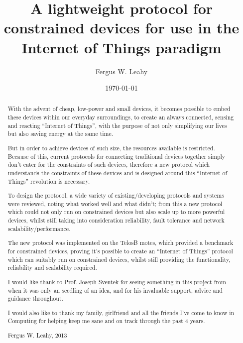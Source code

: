 \documentclass{l4proj}
\begin{document}
\title{A lightweight protocol for constrained devices for use in the Internet of Things paradigm}
\author{Fergus W. Leahy}
\date{\today}
\maketitle

\begin{abstract}
With the advent of cheap, low-power and small devices, it becomes possible to embed these devices within our everyday surroundings, to create an always connected, sensing and reacting ``Internet of Things'', with the purpose of not only simplifying our lives but also saving energy at the same time. 

But in order to achieve devices of such size, the resources available is restricted. Because of this, current protocols for connecting traditional devices together simply don't cater for the constraints of such devices, therefore a new protocol which understands the constraints of these devices and is designed around this ``Internet of Things'' revolution is necessary.

To design the protocol, a wide variety of existing/developing protocols and systems were reviewed, noting what worked well and what didn't; from this a new protocol which could not only run on constrained devices but also scale up to more powerful devices, whilst still taking into consideration reliability, fault tolerance and network scalability/performance.

The new protocol was implemented on the TelosB motes, which provided a benchmark for constrained devices, proving it's possible to create an ``Internet of Things'' protocol which can suitably run on constrained devices, whilst still providing the functionality, reliability and scalability required. 

\end{abstract}

\renewcommand{\abstractname}{Acknowledgements}
\begin{abstract}
I would like thank to Prof. Joseph Sventek for seeing something in this project from when it was only an seedling of an idea, and for his invaluable support, advice and guidance throughout.

\noindent I would also like to thank my family, girlfriend and all the friends I've come to know in Computing for helping keep me sane and on track through the past 4 years.

Fergus W. Leahy, 2013
\end{abstract}
\educationalconsent
%
%
\tableofcontents
\end{document}
